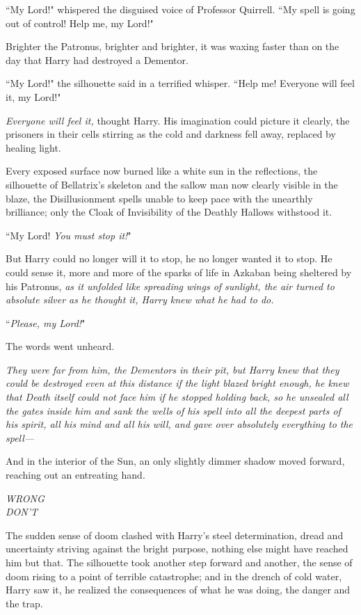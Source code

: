 ``My Lord!" whispered the disguised voice of Professor Quirrell. ``My spell is going out of control! Help me, my Lord!"

Brighter the Patronus, brighter and brighter, it was waxing faster than on the day that Harry had destroyed a Dementor.

``My Lord!" the silhouette said in a terrified whisper. ``Help me! Everyone will feel it, my Lord!"

\emph{Everyone will feel it,} thought Harry. His imagination could picture it clearly, the prisoners in their cells stirring as the cold and darkness fell away, replaced by healing light.

Every exposed surface now burned like a white sun in the reflections, the silhouette of Bellatrix's skeleton and the sallow man now clearly visible in the blaze, the Disillusionment spells unable to keep pace with the unearthly brilliance; only the Cloak of Invisibility of the Deathly Hallows withstood it.

``My Lord! \emph{You must stop it!}"

But Harry could no longer will it to stop, he no longer wanted it to stop. He could sense it, more and more of the sparks of life in Azkaban being sheltered by his Patronus, \emph{as it unfolded like spreading wings of sunlight, the air turned to absolute silver as he thought it, Harry knew what he had to do.}

``\emph{Please, my Lord!}"

The words went unheard.

\emph{They were far from him, the Dementors in their pit, but Harry knew that they could be destroyed even at this distance if the light blazed bright enough, he knew that Death itself could not face him if he stopped holding back, so he unsealed all the gates inside him and sank the wells of his spell into all the deepest parts of his spirit, all his mind and all his will, and gave over absolutely everything to the spell—}

And in the interior of the Sun, an only slightly dimmer shadow moved forward, reaching out an entreating hand.

\emph{WRONG\\
DON'T}

The sudden sense of doom clashed with Harry's steel determination, dread and uncertainty striving against the bright purpose, nothing else might have reached him but that. The silhouette took another step forward and another, the sense of doom rising to a point of terrible catastrophe; and in the drench of cold water, Harry saw it, he realized the consequences of what he was doing, the danger and the trap.

